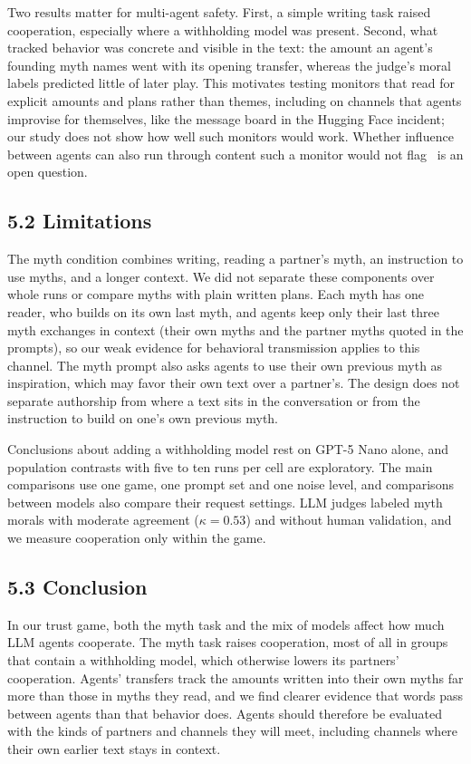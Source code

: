Two results matter for multi-agent safety. First, a simple writing task raised cooperation, especially where a withholding model was present. Second, what tracked behavior was concrete and visible in the text: the amount an agent's founding myth names went with its opening transfer, whereas the judge's moral labels predicted little of later play. This motivates testing monitors that read for explicit amounts and plans rather than themes, including on channels that agents improvise for themselves, like the message board in the Hugging Face incident; our study does not show how well such monitors would work. Whether influence between agents can also run through content such a monitor would not flag~\citep{motwani2024} is an open question.

\subsection{5.2 Limitations}
\label{limitations}

The myth condition combines writing, reading a partner's myth, an instruction to use myths, and a longer context. We did not separate these components over whole runs or compare myths with plain written plans. Each myth has one reader, who builds on its own last myth, and agents keep only their last three myth exchanges in context (their own myths and the partner myths quoted in the prompts), so our weak evidence for behavioral transmission applies to this channel. The myth prompt also asks agents to use their own previous myth as inspiration, which may favor their own text over a partner's. The design does not separate authorship from where a text sits in the conversation or from the instruction to build on one's own previous myth.

Conclusions about adding a withholding model rest on GPT-5 Nano alone, and population contrasts with five to ten runs per cell are exploratory. The main comparisons use one game, one prompt set and one noise level, and comparisons between models also compare their request settings. LLM judges labeled myth morals with moderate agreement ($\kappa=0.53$) and without human validation, and we measure cooperation only within the game.

\subsection{5.3 Conclusion}
\label{conclusion}

In our trust game, both the myth task and the mix of models affect how much LLM agents cooperate. The myth task raises cooperation, most of all in groups that contain a withholding model, which otherwise lowers its partners' cooperation. Agents' transfers track the amounts written into their own myths far more than those in myths they read, and we find clearer evidence that words pass between agents than that behavior does. Agents should therefore be evaluated with the kinds of partners and channels they will meet, including channels where their own earlier text stays in context.
